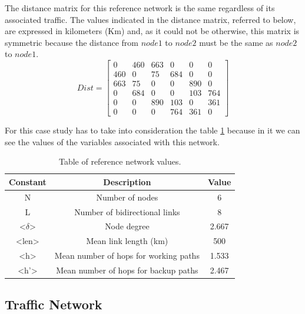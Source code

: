 \vspace{11pt}
The distance matrix for this reference network is the same regardless of its associated traffic.
The values indicated in the distance matrix, referred to below, are expressed in kilometers (Km) and, as it could not be otherwise, this matrix is symmetric because the distance from $node1$ to $node2$ must be the same as $node2$ to $node1$.\\

\[
Dist=
  \begin{bmatrix}
    0 & 460 & 663 & 0 & 0 & 0 \\
    460 & 0 & 75 & 684 & 0 & 0 \\
    663 & 75 & 0 & 0 & 890 & 0 \\
    0 & 684 & 0 & 0 & 103 & 764 \\
    0 & 0 & 890 & 103 & 0 & 361 \\
    0 & 0 & 0 & 764 & 361 & 0
  \end{bmatrix}
\]

\newpage
For this case study has to take into consideration the table \ref{table_ref_net} because in it we can see the values of the variables associated with this network.

\begin{table}[h!]
\centering
\begin{tabular}{|| c | c | c||}
 \hline
 Constant & Description & Value \\
 \hline\hline
 N & Number of nodes & 6 \\
 L & Number of bidirectional links & 8 \\
 <$\delta$> & Node degree & 2.667 \\
 <len> & Mean link length (km) & 500 \\
 <h> & Mean number of hops for working paths & 1.533 \\
 <h'> & Mean number of hops for backup paths & 2.467 \\
 \hline
\end{tabular}
\caption{Table of reference network values.}
\label{table_ref_net}
\end{table}


\subsection{Traffic Network}\label{Reference_Network_Traffic}

